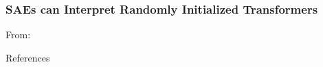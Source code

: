 \documentclass{beamer}
\begin{document}
\begin{frame}
\frametitle{SAEs can Interpret Randomly Initialized Transformers}
From: \cite{heap2025sparseautoencodersinterpretrandomly}
\end{frame}


\begin{frame}{References}
    \footnotesize
    
    
\end{frame}
\end{document}
